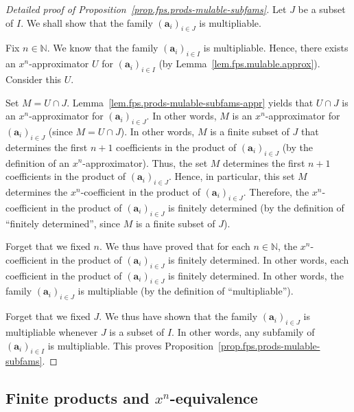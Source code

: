 \begin{proof}[Detailed proof of Proposition~\ref{prop.fps.prods-mulable-subfams}]
\leanok
Let $J$ be a subset of $I$. We shall show that the family
$\left(\mathbf{a}_{i}\right)_{i \in J}$ is multipliable.

Fix $n \in \mathbb{N}$. We know that the family
$\left(\mathbf{a}_{i}\right)_{i \in I}$ is multipliable. Hence, there
exists an $x^n$-approximator $U$ for
$\left(\mathbf{a}_{i}\right)_{i \in I}$ (by
Lemma~\ref{lem.fps.mulable.approx}). Consider this $U$.

Set $M = U \cap J$. Lemma~\ref{lem.fps.prods-mulable-subfams-appr}
yields that $U \cap J$ is an $x^n$-approximator for
$\left(\mathbf{a}_{i}\right)_{i \in J}$. In other words, $M$ is an
$x^n$-approximator for $\left(\mathbf{a}_{i}\right)_{i \in J}$ (since
$M = U \cap J$). In other words, $M$ is a finite subset of $J$ that
determines the first $n+1$ coefficients in the product of
$\left(\mathbf{a}_{i}\right)_{i \in J}$ (by the definition of an
$x^n$-approximator). Thus, the set $M$ determines the first $n+1$
coefficients in the product of
$\left(\mathbf{a}_{i}\right)_{i \in J}$. Hence, in particular, this set
$M$ determines the $x^n$-coefficient in the product of
$\left(\mathbf{a}_{i}\right)_{i \in J}$. Therefore, the
$x^n$-coefficient in the product of
$\left(\mathbf{a}_{i}\right)_{i \in J}$ is finitely determined (by the
definition of ``finitely determined'', since $M$ is a finite subset
of $J$).

Forget that we fixed $n$. We thus have proved that for each
$n \in \mathbb{N}$, the $x^n$-coefficient in the product of
$\left(\mathbf{a}_{i}\right)_{i \in J}$ is finitely determined. In
other words, each coefficient in the product of
$\left(\mathbf{a}_{i}\right)_{i \in J}$ is finitely determined. In
other words, the family $\left(\mathbf{a}_{i}\right)_{i \in J}$ is
multipliable (by the definition of ``multipliable'').

Forget that we fixed $J$. We thus have shown that the family
$\left(\mathbf{a}_{i}\right)_{i \in J}$ is multipliable whenever $J$ is
a subset of $I$. In other words, any subfamily of
$\left(\mathbf{a}_{i}\right)_{i \in I}$ is multipliable.
This proves Proposition~\ref{prop.fps.prods-mulable-subfams}.
\end{proof}

\subsection{Finite products and $x^n$-equivalence}

